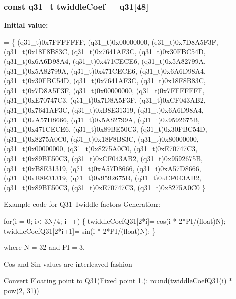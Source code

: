 \subsubsection[{\texorpdfstring{twiddle\+Coef\+\_\+32\+\_\+q31}{twiddleCoef_32_q31}}]{\setlength{\rightskip}{0pt plus 5cm}const q31\+\_\+t twiddle\+Coef\+\_\+\_\+q31\mbox{[}48\mbox{]}}\hypertarget{group__CFFT__CIFFT_ga8ba78d5e6ef4bdc58e8f0044e0664a0a}{}\label{group__CFFT__CIFFT_ga8ba78d5e6ef4bdc58e8f0044e0664a0a}
{\bfseries Initial value\+:}
\begin{DoxyCode}
= \{
    (q31\_t)0x7FFFFFFF, (q31\_t)0x00000000,
    (q31\_t)0x7D8A5F3F, (q31\_t)0x18F8B83C,
    (q31\_t)0x7641AF3C, (q31\_t)0x30FBC54D,
    (q31\_t)0x6A6D98A4, (q31\_t)0x471CECE6,
    (q31\_t)0x5A82799A, (q31\_t)0x5A82799A,
    (q31\_t)0x471CECE6, (q31\_t)0x6A6D98A4,
    (q31\_t)0x30FBC54D, (q31\_t)0x7641AF3C,
    (q31\_t)0x18F8B83C, (q31\_t)0x7D8A5F3F,
    (q31\_t)0x00000000, (q31\_t)0x7FFFFFFF,
    (q31\_t)0xE70747C3, (q31\_t)0x7D8A5F3F,
    (q31\_t)0xCF043AB2, (q31\_t)0x7641AF3C,
    (q31\_t)0xB8E31319, (q31\_t)0x6A6D98A4,
    (q31\_t)0xA57D8666, (q31\_t)0x5A82799A,
    (q31\_t)0x9592675B, (q31\_t)0x471CECE6,
    (q31\_t)0x89BE50C3, (q31\_t)0x30FBC54D,
    (q31\_t)0x8275A0C0, (q31\_t)0x18F8B83C,
    (q31\_t)0x80000000, (q31\_t)0x00000000,
    (q31\_t)0x8275A0C0, (q31\_t)0xE70747C3,
    (q31\_t)0x89BE50C3, (q31\_t)0xCF043AB2,
    (q31\_t)0x9592675B, (q31\_t)0xB8E31319,
    (q31\_t)0xA57D8666, (q31\_t)0xA57D8666,
    (q31\_t)0xB8E31319, (q31\_t)0x9592675B,
    (q31\_t)0xCF043AB2, (q31\_t)0x89BE50C3,
    (q31\_t)0xE70747C3, (q31\_t)0x8275A0C0
\}
\end{DoxyCode}
\begin{DoxyParagraph}{}
Example code for Q31 Twiddle factors Generation\+:\+: 
\end{DoxyParagraph}
\begin{DoxyParagraph}{}

\begin{DoxyPre}for(i = 0; i< 3N/4; i++)
\{
   twiddleCoefQ31[2*i]= cos(i * 2*PI/(float)N);
   twiddleCoefQ31[2*i+1]= sin(i * 2*PI/(float)N);
\} \end{DoxyPre}
 
\end{DoxyParagraph}
\begin{DoxyParagraph}{}
where N = 32 and PI = 3. 
\end{DoxyParagraph}
\begin{DoxyParagraph}{}
Cos and Sin values are interleaved fashion 
\end{DoxyParagraph}
\begin{DoxyParagraph}{}
Convert Floating point to Q31(Fixed point 1.)\+: round(twiddle\+Coef\+Q31(i) $\ast$ pow(2, 31)) 
\end{DoxyParagraph}
